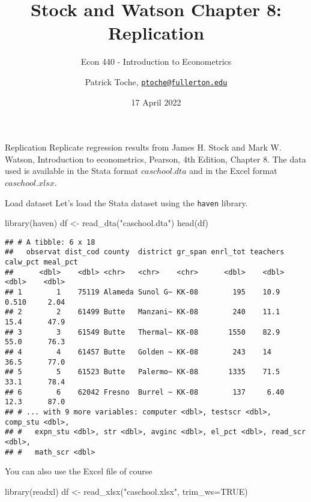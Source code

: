 \documentclass[
  10pt,
  ignorenonframetext,
  t, svgnames, handout]{beamer}
\title{Stock and Watson Chapter 8: Replication}
\subtitle{Econ 440 - Introduction to Econometrics}
\author{Patrick Toche,
\href{mailto:ptoche@fullerton.edu}{\nolinkurl{ptoche@fullerton.edu}}}
\date{17 April 2022}
\newenvironment{Shaded}{\begin{snugshade}}{\end{snugshade}}
\newcommand{\AttributeTok}[1]{\textcolor[rgb]{0.77,0.63,0.00}{#1}}
\newcommand{\ConstantTok}[1]{\textcolor[rgb]{0.00,0.00,0.00}{#1}}
\newcommand{\FunctionTok}[1]{\textcolor[rgb]{0.00,0.00,0.00}{#1}}
\newcommand{\NormalTok}[1]{#1}
\newcommand{\OtherTok}[1]{\textcolor[rgb]{0.56,0.35,0.01}{#1}}
\newcommand{\StringTok}[1]{\textcolor[rgb]{0.31,0.60,0.02}{#1}}
\begin{document}
\frame{\titlepage}

\begin{frame}{Replication}
\protect\hypertarget{replication}{}
Replicate regression results from James H. Stock and Mark W. Watson,
Introduction to econometrics, Pearson, 4th Edition, Chapter 8. The data
used is available in the Stata format \(caschool.dta\) and in the Excel
format \(caschool.xlsx\).
\end{frame}

\begin{frame}[fragile]{Load dataset}
\protect\hypertarget{load-dataset}{}
Let's load the Stata dataset using the \texttt{haven} library.

\scriptsize

\begin{Shaded}
\begin{Highlighting}[]
\FunctionTok{library}\NormalTok{(haven)}
\NormalTok{df }\OtherTok{\textless{}{-}} \FunctionTok{read\_dta}\NormalTok{(}\StringTok{"caschool.dta"}\NormalTok{)}
\FunctionTok{head}\NormalTok{(df)}
\end{Highlighting}
\end{Shaded}

\begin{verbatim}
## # A tibble: 6 x 18
##   observat dist_cod county  district gr_span enrl_tot teachers calw_pct meal_pct
##      <dbl>    <dbl> <chr>   <chr>    <chr>      <dbl>    <dbl>    <dbl>    <dbl>
## 1        1    75119 Alameda Sunol G~ KK-08        195    10.9     0.510     2.04
## 2        2    61499 Butte   Manzani~ KK-08        240    11.1    15.4      47.9 
## 3        3    61549 Butte   Thermal~ KK-08       1550    82.9    55.0      76.3 
## 4        4    61457 Butte   Golden ~ KK-08        243    14      36.5      77.0 
## 5        5    61523 Butte   Palermo~ KK-08       1335    71.5    33.1      78.4 
## 6        6    62042 Fresno  Burrel ~ KK-08        137     6.40   12.3      87.0 
## # ... with 9 more variables: computer <dbl>, testscr <dbl>, comp_stu <dbl>,
## #   expn_stu <dbl>, str <dbl>, avginc <dbl>, el_pct <dbl>, read_scr <dbl>,
## #   math_scr <dbl>
\end{verbatim}

\normalsize You can also use the Excel file of course

\scriptsize

\begin{Shaded}
\begin{Highlighting}[]
\FunctionTok{library}\NormalTok{(readxl)}
\NormalTok{df }\OtherTok{\textless{}{-}} \FunctionTok{read\_xlsx}\NormalTok{(}\StringTok{"caschool.xlsx"}\NormalTok{, }\AttributeTok{trim\_ws=}\ConstantTok{TRUE}\NormalTok{)}
\end{Highlighting}
\end{Shaded}

\normalsize
\end{frame}
\end{document}
